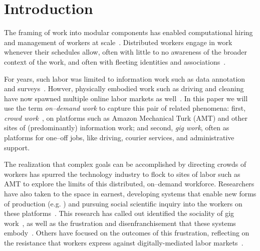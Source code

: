 \documentclass[trackingWork]{subfiles}
\begin{document}
\section{Introduction}\label{sec:introduction}

The framing of work into modular components
has enabled computational hiring and management of workers at scale~\cite{howe2008crowdsourcing,Bigham2014,crowdworkFuture}.
Distributed workers engage in work whenever their schedules allow,
often with little to no awareness of the broader context of the work, and
often with fleeting identities and associations~\cite{martin2014being,uberAlgorithm}.

For years, such labor was limited to information work such as data annotation and surveys~\cite{CrowdsourcingUserStudies,movieSummarizationWu,yuenSurvey,geiger2011managing,quinnbedersonTaxonomy}.
Howver, physically embodied work such as driving and cleaning have now spawned multiple online labor markets as well~\cite{uberAlgorithm,uberOfficial,zaarlyOfficial,taskrabbitOfficial}.
In this paper we will use the term \textit{on--demand work} to capture this pair of related phenomena:
first, \textit{crowd work}~\cite{crowdworkFuture}, on platforms such as Amazon Mechanical Turk (AMT) and other sites of (predominantly) information work;
and second, \textit{gig work}, often as platforms for one--off jobs, like driving, courier services, and administrative support.

The realization that complex goals can be accomplished by directing  crowds of workers has spurred the technology industry to flock to sites of labor
such as AMT to explore the limits of this distributed, on--demand workforce.
Researchers have also taken to the space in earnest,
developing systems that enable new forms of production
(e.g. \cite{bernsteinSoylent,vizwiz,paolacci2010running}) and pursuing social scientific inquiry into the workers on these platforms~\cite{Ross,whoareNOTtheTurkers}.
This research has called out identified the sociality of gig work~\cite{crowdcollab},
as well as the frustration and disenfranchisement that these systems embody~\cite{turkopticon,martin2014being,takingAHITMcInnis}.
Others have focused on the outcomes of this frustration,
reflecting on the resistance that workers express against digitally-mediated labor markets~\cite{uberAlgorithm,dynamo}.
\end{document}
